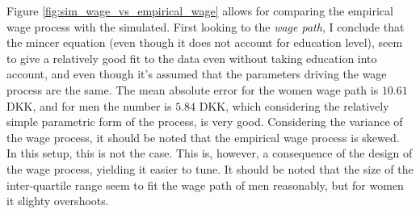 Figure \ref{fig:sim_wage_vs_empirical_wage} allows for comparing the empirical wage process with the simulated. First looking to the \textit{wage path}, I conclude that the mincer equation (even though it does not account for education level), seem to give a relatively good fit to the data even without taking education into account, and even though it's assumed that the parameters driving the wage process are the same. The mean absolute error for the women wage path is $10.61$ DKK, and for men the number is $5.84$ DKK, which considering the relatively simple parametric form of the process, is very good. Considering the variance of the wage process, it should be noted that the empirical wage process is skewed. In this setup, this is not the case. This is, however, a consequence of the design of the wage process, yielding it easier to tune. It should be noted that the size of the inter-quartile range seem to fit the wage path of men reasonably, but for women it slighty overshoots.

